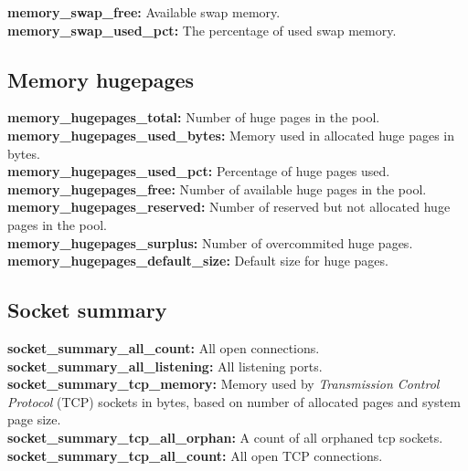 \documentclass{iosart2c}
\begin{document}
\textbf{memory\_swap\_free:} Available swap memory.\\

\textbf{memory\_swap\_used\_pct:} The percentage of used swap memory.\\


\subsection{Memory hugepages}

\textbf{memory\_hugepages\_total:} Number of huge pages in the pool.\\

\textbf{memory\_hugepages\_used\_bytes:} Memory used in allocated huge pages in bytes.\\

\textbf{memory\_hugepages\_used\_pct:} Percentage of huge pages used.\\

\textbf{memory\_hugepages\_free:} Number of available huge pages in the pool.\\

\textbf{memory\_hugepages\_reserved:} Number of reserved but not allocated huge pages in the pool.\\

\textbf{memory\_hugepages\_surplus:} Number of overcommited huge pages.\\

\textbf{memory\_hugepages\_default\_size:} Default size for huge pages.




\subsection{Socket summary}

\textbf{socket\_summary\_all\_count:} All open connections.\\

\textbf{socket\_summary\_all\_listening:} All listening ports.\\

\textbf{socket\_summary\_tcp\_memory:} Memory used by  \textit{Transmission Control Protocol} (TCP) sockets in bytes, based on number of allocated pages and system page size. \\

\textbf{socket\_summary\_tcp\_all\_orphan:} A count of all orphaned tcp sockets.\\

\textbf{socket\_summary\_tcp\_all\_count:} All open TCP connections.\\
\end{document}

